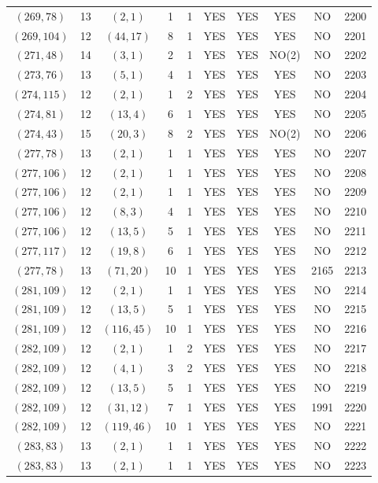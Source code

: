 \begin{longtable}{|c|c|c|c|c|c|c|c|c|c|}
$(269, 78)$ & 13 & $(2, 1)$ & 1 & 1 & YES & YES & YES & NO & 2200\\
$(269, 104)$ & 12 & $(44, 17)$ & 8 & 1 & YES & YES & YES & NO & 2201\\
$(271, 48)$ & 14 & $(3, 1)$ & 2 & 1 & YES & YES & NO(2) & NO & 2202\\
$(273, 76)$ & 13 & $(5, 1)$ & 4 & 1 & YES & YES & YES & NO & 2203\\
$(274, 115)$ & 12 & $(2, 1)$ & 1 & 2 & YES & YES & YES & NO & 2204\\
$(274, 81)$ & 12 & $(13, 4)$ & 6 & 1 & YES & YES & YES & NO & 2205\\
$(274, 43)$ & 15 & $(20, 3)$ & 8 & 2 & YES & YES & NO(2) & NO & 2206\\
$(277, 78)$ & 13 & $(2, 1)$ & 1 & 1 & YES & YES & YES & NO & 2207\\
$(277, 106)$ & 12 & $(2, 1)$ & 1 & 1 & YES & YES & YES & NO & 2208\\
$(277, 106)$ & 12 & $(2, 1)$ & 1 & 1 & YES & YES & YES & NO & 2209\\
$(277, 106)$ & 12 & $(8, 3)$ & 4 & 1 & YES & YES & YES & NO & 2210\\
$(277, 106)$ & 12 & $(13, 5)$ & 5 & 1 & YES & YES & YES & NO & 2211\\
$(277, 117)$ & 12 & $(19, 8)$ & 6 & 1 & YES & YES & YES & NO & 2212\\
$(277, 78)$ & 13 & $(71, 20)$ & 10 & 1 & YES & YES & YES & 2165 & 2213\\
$(281, 109)$ & 12 & $(2, 1)$ & 1 & 1 & YES & YES & YES & NO & 2214\\
$(281, 109)$ & 12 & $(13, 5)$ & 5 & 1 & YES & YES & YES & NO & 2215\\
$(281, 109)$ & 12 & $(116, 45)$ & 10 & 1 & YES & YES & YES & NO & 2216\\
$(282, 109)$ & 12 & $(2, 1)$ & 1 & 2 & YES & YES & YES & NO & 2217\\
$(282, 109)$ & 12 & $(4, 1)$ & 3 & 2 & YES & YES & YES & NO & 2218\\
$(282, 109)$ & 12 & $(13, 5)$ & 5 & 1 & YES & YES & YES & NO & 2219\\
$(282, 109)$ & 12 & $(31, 12)$ & 7 & 1 & YES & YES & YES & 1991 & 2220\\
$(282, 109)$ & 12 & $(119, 46)$ & 10 & 1 & YES & YES & YES & NO & 2221\\
$(283, 83)$ & 13 & $(2, 1)$ & 1 & 1 & YES & YES & YES & NO & 2222\\
$(283, 83)$ & 13 & $(2, 1)$ & 1 & 1 & YES & YES & YES & NO & 2223\\

\end{longtable}

